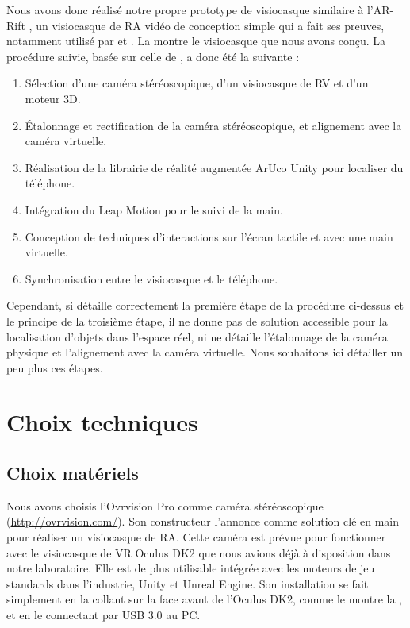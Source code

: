 Nous avons donc réalisé notre propre prototype de visiocasque similaire à l'AR-Rift \citep{Steptoe2013}, un visiocasque de RA vidéo de conception simple qui a fait ses preuves, notamment utilisé par \cite{Steptoe2014} et \cite{Piumsomboon2014}. La  montre le visiocasque que nous avons conçu. La procédure suivie, basée sur celle de \cite{Steptoe2013}, a donc été la suivante :
\begin{enumerate}
  \item Sélection d'une caméra stéréoscopique, d'un visiocasque de RV et d'un moteur 3D.
  \item Étalonnage et rectification de la caméra stéréoscopique, et alignement avec la caméra virtuelle.
  \item Réalisation de la librairie de réalité augmentée ArUco Unity pour localiser du téléphone.
  \item Intégration du Leap Motion pour le suivi de la main.
  \item Conception de techniques d'interactions sur l'écran tactile et avec une main virtuelle.
  \item Synchronisation entre le visiocasque et le téléphone.
\end{enumerate}

Cependant, si \cite{Steptoe2013} détaille correctement la première étape de la procédure ci-dessus et le principe de la troisième étape, il ne donne pas de solution accessible pour la localisation d'objets dans l'espace réel, ni ne détaille l'étalonnage de la caméra physique et l'alignement avec la caméra virtuelle. Nous souhaitons ici détailler un peu plus ces étapes.



\section{Choix techniques}
\label{sec:technical_choices}

\subsection{Choix matériels}
Nous avons choisis l'Ovrvision Pro comme caméra stéréoscopique (\url{http://ovrvision.com/}). Son constructeur l'annonce comme solution clé en main pour réaliser un visiocasque de RA. Cette caméra est prévue pour fonctionner avec le visiocasque de VR Oculus DK2 que nous avions déjà à disposition dans notre laboratoire. Elle est de plus utilisable intégrée avec les moteurs de jeu standards dans l'industrie, Unity et Unreal Engine. Son installation se fait simplement en la collant sur la face avant de l'Oculus DK2, comme le montre la , et en le connectant par USB 3.0 au PC.

